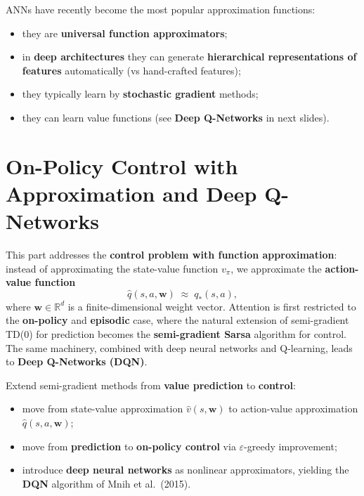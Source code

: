 \documentclass[11pt,a4paper]{article}
\theoremstyle{definition}
\theoremstyle{plain}
\theoremstyle{remark}
\begin{document}
\begin{tcolorbox}[colback=blue!5!white, colframe=blue!60!black, title={Artificial Neural Networks}]
ANNs have recently become the most popular approximation functions:
\begin{itemize}
    \item they are \textbf{universal function approximators};
    \item in \textbf{deep architectures} they can generate \textbf{hierarchical representations of features} automatically (vs hand-crafted features);
    \item they typically learn by \textbf{stochastic gradient} methods;
    \item they can learn value functions (see \textbf{Deep Q-Networks} in next slides).
\end{itemize}
\end{tcolorbox}

\part{On-Policy Control with Approximation and Deep Q-Networks}

This part addresses the \textbf{control problem with function approximation}: instead of approximating the state-value function $v_\pi$, we approximate the \textbf{action-value function}
\[
    \hat{q}(s, a, \mathbf{w}) \;\approx\; q_*(s, a),
\]
where $\mathbf{w} \in \mathbb{R}^d$ is a finite-dimensional weight vector. Attention is first restricted to the \textbf{on-policy} and \textbf{episodic} case, where the natural extension of semi-gradient TD(0) for prediction becomes the \textbf{semi-gradient Sarsa} algorithm for control. The same machinery, combined with deep neural networks and Q-learning, leads to \textbf{Deep Q-Networks (DQN)}.

\begin{tcolorbox}[colback=blue!5!white, colframe=blue!60!black, title={Goal of this Lecture}]
Extend semi-gradient methods from \textbf{value prediction} to \textbf{control}:
\begin{itemize}
    \item move from state-value approximation $\hat{v}(s, \mathbf{w})$ to action-value approximation $\hat{q}(s, a, \mathbf{w})$;
    \item move from \textbf{prediction} to \textbf{on-policy control} via $\varepsilon$-greedy improvement;
    \item introduce \textbf{deep neural networks} as nonlinear approximators, yielding the \textbf{DQN} algorithm of Mnih et al.\ (2015).
\end{itemize}
\end{tcolorbox}
\end{document}
